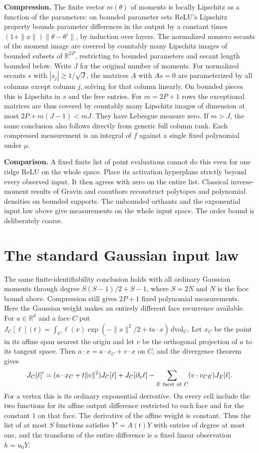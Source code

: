 \documentclass[10pt]{article}
\begin{document}
\textbf{Compression.} The finite vector $m(\theta)$ of moments is locally Lipschitz as a function of the parameters: on bounded parameter sets ReLU's Lipschitz property bounds parameter differences in the output by a constant times $(1+\|x\|)\|\theta-\theta'\|$, by induction over layers. The normalized nonzero secants of the moment image are covered by countably many Lipschitz images of bounded subsets of $\mathbb R^{2P}$, restricting to bounded parameters and secant length bounded below. Write $J$ for the original number of moments. For normalized secants $s$ with $|s_j|\ge1/\sqrt J$, the matrices $A$ with $As=0$ are parameterized by all columns except column $j$, solving for that column linearly. On bounded pieces this is Lipschitz in $s$ and the free entries. For $m=2P+1$ rows the exceptional matrices are thus covered by countably many Lipschitz images of dimension at most $2P+m(J-1)<mJ$. They have Lebesgue measure zero. If $m>J$, the same conclusion also follows directly from generic full column rank. Each compressed measurement is an integral of $f$ against a single fixed polynomial under $\mu$.

\textbf{Comparison.} A fixed finite list of point evaluations cannot do this even for one ridge ReLU on the whole space. Place its activation hyperplane strictly beyond every observed input. It then agrees with zero on the entire list. Classical inverse-moment results of Gravin and coauthors reconstruct polytopes and polynomial densities on bounded supports. The unbounded orthants and the exponential input law above give measurements on the whole input space. The order bound is deliberately coarse.
\section*{The standard Gaussian input law}
The same finite-identifiability conclusion holds with all ordinary Gaussian moments through degree $S(S-1)/2+S-1$, where $S=2N$ and $N$ is the face bound above. Compression still gives $2P+1$ fixed polynomial measurements. Here the Gaussian weight makes an entirely different face recurrence available. For $a\in\mathbb R^d$ and a face $C$ put $J_C[\ell](t)=\int_C\ell(x)\exp(-\|x\|^2/2+ta\cdot x)\,d\mathrm{vol}_C$. Let $x_C$ be the point in its affine span nearest the origin and let $v$ be the orthogonal projection of $a$ to its tangent space. Then $a\cdot x=a\cdot x_C+v\cdot x$ on $C$, and the divergence theorem gives
\[
 J_C[\ell]'=(a\cdot x_C+t\|v\|^2)J_C[\ell]
 + J_C[\partial_v\ell]-\sum_{E\ {\rm facet\ of}\ C}(v\cdot\nu_{CE})J_E[\ell].
\]
For a vertex this is its ordinary exponential derivative. On every cell include the two functions for its affine output difference restricted to each face and for the constant $1$ on that face. The derivative of the affine weight is constant. Thus the list of at most $S$ functions satisfies $Y'=A(t)Y$ with entries of degree at most one, and the transform of the entire difference is a fixed linear observation $h=u_0Y$.
\end{document}
